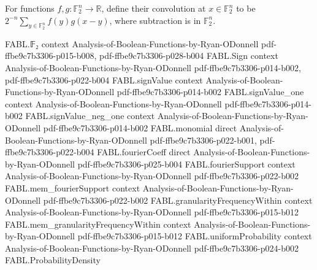 \begin{definition}
\label{FABL.convolution}
\leanok
For functions $f,g:\mathbb{F}_2^n\to\mathbb{R}$, define their convolution at
$x\in\mathbb{F}_2^n$ to be $2^{-n}\sum_{y\in\mathbb{F}_2^n} f(y)g(x-y)$, where
subtraction is in $\mathbb{F}_2^n$.
\end{definition}

\begin{theorem}
\label{FABL.convolution_apply}
\leanok
{}
\proofstep
  {FABL.𝔽₂}
  {context}
  {Analysis-of-Boolean-Functions-by-Ryan-ODonnell}
  {pdf-ffbe9c7b3306-p015-b008,
    pdf-ffbe9c7b3306-p028-b004}
\proofstep
  {FABL.Sign}
  {context}
  {Analysis-of-Boolean-Functions-by-Ryan-ODonnell}
  {pdf-ffbe9c7b3306-p014-b002,
    pdf-ffbe9c7b3306-p022-b004}
\proofstep
  {FABL.signValue}
  {context}
  {Analysis-of-Boolean-Functions-by-Ryan-ODonnell}
  {pdf-ffbe9c7b3306-p014-b002}
\proofstep
  {FABL.signValue_one}
  {context}
  {Analysis-of-Boolean-Functions-by-Ryan-ODonnell}
  {pdf-ffbe9c7b3306-p014-b002}
\proofstep
  {FABL.signValue_neg_one}
  {context}
  {Analysis-of-Boolean-Functions-by-Ryan-ODonnell}
  {pdf-ffbe9c7b3306-p014-b002}
\proofstep
  {FABL.monomial}
  {direct}
  {Analysis-of-Boolean-Functions-by-Ryan-ODonnell}
  {pdf-ffbe9c7b3306-p022-b001,
    pdf-ffbe9c7b3306-p022-b004}
\proofstep
  {FABL.fourierCoeff}
  {direct}
  {Analysis-of-Boolean-Functions-by-Ryan-ODonnell}
  {pdf-ffbe9c7b3306-p025-b004}
\proofstep
  {FABL.fourierSupport}
  {context}
  {Analysis-of-Boolean-Functions-by-Ryan-ODonnell}
  {pdf-ffbe9c7b3306-p022-b002}
\proofstep
  {FABL.mem_fourierSupport}
  {context}
  {Analysis-of-Boolean-Functions-by-Ryan-ODonnell}
  {pdf-ffbe9c7b3306-p022-b002}
\proofstep
  {FABL.granularityFrequencyWithin}
  {context}
  {Analysis-of-Boolean-Functions-by-Ryan-ODonnell}
  {pdf-ffbe9c7b3306-p015-b012}
\proofstep
  {FABL.mem_granularityFrequencyWithin}
  {context}
  {Analysis-of-Boolean-Functions-by-Ryan-ODonnell}
  {pdf-ffbe9c7b3306-p015-b012}
\proofstep
  {FABL.uniformProbability}
  {context}
  {Analysis-of-Boolean-Functions-by-Ryan-ODonnell}
  {pdf-ffbe9c7b3306-p024-b002}
\proofstep
  {FABL.ProbabilityDensity}

\end{theorem}
